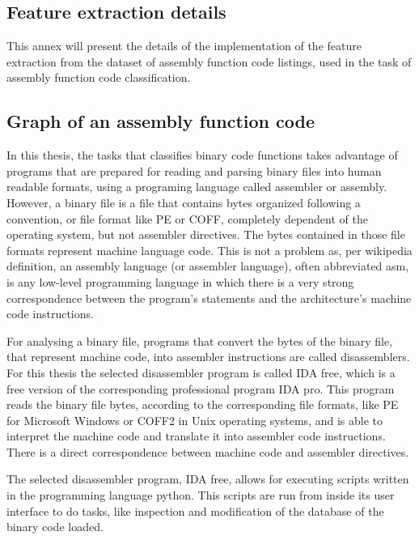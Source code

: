 
\newpage
\begin{appendices}


\section{Feature extraction details}

This annex will present the details of the implementation of the feature extraction from the dataset of assembly function code listings, used in the task of assembly function code classification.

\subsection{Graph of an assembly function code}

In this thesis, the tasks that classifies binary code functions takes advantage of programs that are prepared for reading and parsing binary files into human readable formats, using a programing language called assembler or assembly. However, a binary file is a file that contains bytes organized following a convention, or file format like PE or COFF, completely dependent of the operating system, but not assembler directives. The bytes contained in those file formats represent machine language code. This is not a problem as, per wikipedia definition, an assembly language (or assembler language), often abbreviated asm, is any low-level programming language in which there is a very strong correspondence between the program's statements and the architecture's machine code instructions. 


For analysing a binary file, programs that convert the bytes of the binary file, that represent machine code, into assembler instructions are called disassemblers. For this thesis the selected disassembler program is called IDA free, which is a free version of the corresponding professional program IDA pro. This program reads the binary file bytes, according to the corresponding file formats, like PE for Microsoft Windows or COFF2 in Unix operating systems, and is able to interpret the machine code and translate it into assembler code instructions. There is a direct correspondence between machine code and assembler directives.

The selected disassembler program, IDA free, allows for executing scripts written in the programming language python. This scripts are run from inside its user interface to do tasks, like inspection and modification of the database of the binary code loaded.


\end{appendices}
